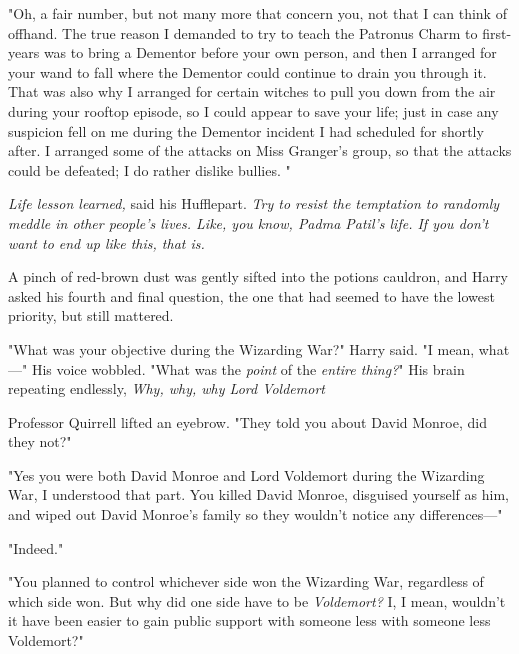 "Oh, a fair number, but not many more that concern you, not that I can think of
offhand. The true reason I demanded to try to teach the Patronus Charm to
first-years was to bring a Dementor before your own person, and then I arranged
for your wand to fall where the Dementor could continue to drain you through
it.  That was also why I arranged for certain witches to pull
you down from the air during your rooftop episode, so I could appear to save
your life; just in case any suspicion fell on me during the Dementor incident I
had scheduled for shortly after.  I arranged some
of the attacks on Miss Granger's group, so that the attacks could be defeated;
I do rather dislike bullies. "

\emph{Life lesson learned,} said his Hufflepart. \emph{Try to resist the
temptation to randomly meddle in other people's lives. Like, you know, Padma
Patil's life. If you don't want to end up like this, that is.}

A pinch of red-brown dust was gently sifted into the potions cauldron, and
Harry asked his fourth and final question, the one that had seemed to have the
lowest priority, but still mattered.

"What was your objective during the Wizarding War?" Harry said. "I mean,
what\mbox{---}" His voice wobbled. "What was the \emph{point} of the \emph{entire
thing?}" His brain repeating endlessly, \emph{Why, why, why Lord
Voldemort{\el}}

Professor Quirrell lifted an eyebrow. "They told you about David Monroe, did
they not?"

"Yes you were both David Monroe and Lord Voldemort during the Wizarding War, I
understood that part. You killed David Monroe, disguised yourself as him, and
wiped out David Monroe's family so they wouldn't notice any differences\mbox{---}"

"Indeed."

"You planned to control whichever side won the Wizarding War, regardless of
which side won. But why did one side have to be \emph{Voldemort?} I, I mean,
wouldn't it have been easier to gain public support with someone less{\el}
with someone less Voldemort?"

